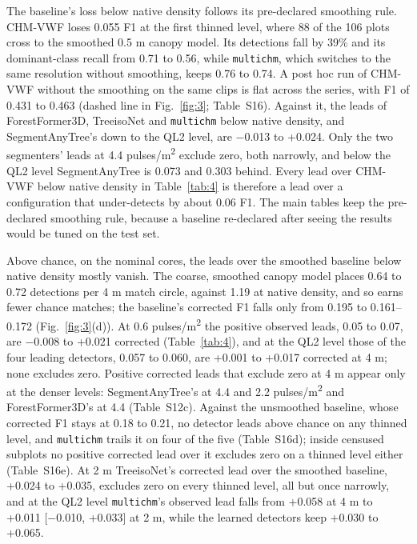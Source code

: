\documentclass[journal]{IEEEtran}
\begin{document}
The baseline's loss below native density follows its pre-declared smoothing
rule. CHM-VWF loses 0.055 F1 at the first thinned level, where 88 of the 106
plots cross to the smoothed 0.5 m canopy model. Its detections fall by 39\% and
its dominant-class recall from 0.71 to 0.56, while \texttt{multichm}, which switches to
the same resolution without smoothing, keeps 0.76 to 0.74. A post hoc run of
CHM-VWF without the smoothing on the same clips is flat across the series, with
F1 of 0.431 to 0.463 (dashed line in Fig.~\ref{fig:3}; Table~S16). Against it, the leads
of ForestFormer3D, TreeisoNet and \texttt{multichm} below native density, and
SegmentAnyTree's down to the QL2 level, are $-$0.013 to +0.024. Only the two
segmenters' leads at 4.4 pulses/m\textsuperscript{2} exclude zero, both narrowly, and below the
QL2 level SegmentAnyTree is 0.073 and 0.303 behind. Every lead over CHM-VWF
below native density in Table~\ref{tab:4} is therefore a lead over a configuration that
under-detects by about 0.06 F1. The main tables keep the pre-declared smoothing
rule, because a baseline re-declared after seeing the results would be tuned on
the test set.

Above chance, on the nominal cores, the leads over the smoothed baseline below
native density mostly vanish. The coarse, smoothed canopy model places 0.64 to
0.72 detections per 4 m match circle, against 1.19 at native density, and so
earns fewer chance matches; the baseline's corrected F1 falls only from 0.195 to
0.161--0.172 (Fig.~\ref{fig:3}(d)). At 0.6 pulses/m\textsuperscript{2} the positive observed leads, 0.05 to
0.07, are $-$0.008 to +0.021 corrected (Table~\ref{tab:4}), and at the QL2 level those of
the four leading detectors, 0.057 to 0.060, are +0.001 to +0.017 corrected at 4
m; none excludes zero. Positive corrected leads that exclude zero at 4 m appear
only at the denser levels: SegmentAnyTree's at 4.4 and 2.2 pulses/m\textsuperscript{2} and
ForestFormer3D's at 4.4 (Table~S12c). Against the unsmoothed baseline, whose
corrected F1 stays at 0.18 to 0.21, no detector leads above chance on any
thinned level, and \texttt{multichm} trails it on four of the five (Table~S16d); inside
censused subplots no positive corrected lead over it excludes zero on a thinned
level either (Table~S16e). At 2 m TreeisoNet's corrected lead over the smoothed
baseline, +0.024 to +0.035, excludes zero on every thinned level, all but once
narrowly, and at the QL2 level \texttt{multichm}'s observed lead falls from +0.058 at 4
m to +0.011 [$-$0.010, +0.033] at 2 m, while the learned detectors keep +0.030 to
+0.065.
\end{document}
